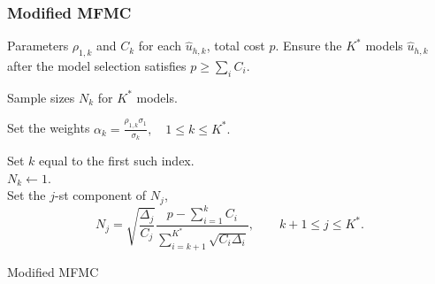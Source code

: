\documentclass{beamer}
\begin{document}
\begin{frame}[t]
    \frametitle{Modified MFMC}

    
    \begin{algorithm}[H]
    {\fontsize{8}{8}\selectfont 
    \begin{algorithmic}[1]

    \REQUIRE Parameters $\rho_{1,k}$ and $C_k$ for each $\widehat u_{h, k}$, total cost $p$. Ensure the $K^*$ models $\widehat u_{h, k}$ after the model selection satisfies $p\ge \sum_i C_i$.

    \ENSURE Sample sizes $N_k$ for $K^*$ models.

    \vspace{2mm}
    
    \STATE Set the weights $\alpha_k = \frac{\rho_{1,k}\sigma_1}{\sigma_k}, \quad 1\le k\le K^*.$

    
    \STATE  Set $k$ equal to the first such index.\\
            $N_k\gets 1$. \\
            Set the $j$-st component of $N_j$,
            \[
            N_{j} = \sqrt{\frac{\Delta_{j}}{C_{j}}}\frac{p-\sum_{i=1}^k C_i}{\sum_{i=k+1}^{K^*} \sqrt{C_i\Delta_i}}, \qquad k+1\le j\le K^*.
            \]
    \ENDWHILE
    
    \end{algorithmic}
    \caption{Modified MFMC}
    }
    \end{algorithm}
    
\end{frame}
\end{document}
